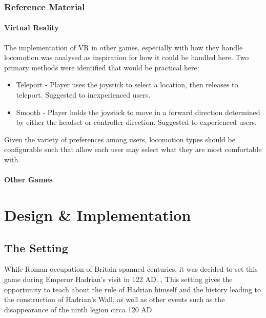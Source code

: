 \documentclass[sigconf,authordraft]{acmart}
\begin{document}
\subsubsection{Reference Material}

\paragraph{Virtual Reality}
The implementation of VR in other games, especially with how they handle
locomotion was analysed as inspiration for how it could be handled here. Two
primary methods were identified that would be practical here:

\begin{itemize}
  \item Teleport - Player uses the joystick to select a location, then releases
        to teleport. Suggested to inexperienced users.
  \item Smooth - Player holds the joystick to move in a forward direction
        determined by either the headset or controller direction. Suggested to
        experienced users.
\end{itemize}

Given the variety of preferences among users, locomotion types should be
configurable such that allow each user may select what they are most comfortable
with.



\paragraph{Other Games}

\section{Design \& Implementation}

\subsection{The Setting}

While Roman occupation of Britain spanned centuries, it was decided to set this
game during Emperor Hadrian's visit in 122 AD.
\cite[p.176]{danziger_hadrians_2006}, \cite[p.157]{moffat_wall_2009}
This setting gives the opportunity to teach about the rule of Hadrian himself
and the history leading to the construction of Hadrian's Wall, as well as other
events such as the disappearance of the ninth legion circa 120 AD.
\end{document}
